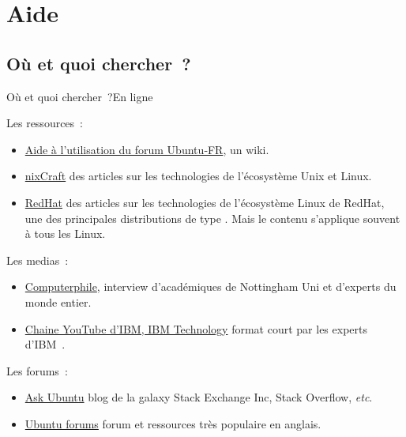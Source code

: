 \documentclass{beamer}
\begin{document}
    \section{Aide}\label{sec:aide}

    \subsection{Où et quoi chercher~?}\label{subsec:aide-ou-quand}

    \begin{frame}{Où et quoi chercher~?}{En ligne}
        \begin{footnotesize}
            Les ressources~:
            \begin{itemize}
                \item \href{https://doc.ubuntu-fr.org/}{Aide à l'utilisation du forum Ubuntu‑FR}, un wiki.
                \item \href{https://www.cyberciti.biz/}{nixCraft} des articles sur les technologies de l'écosystème Unix et Linux.
                \item \href{https://www.redhat.com/}{RedHat} des articles sur les technologies de l'écosystème Linux de RedHat, une des principales distributions de type .
                Mais le contenu s'applique souvent à tous les Linux.
            \end{itemize}
            Les medias~:
            \begin{itemize}
                \item \href{http://www.youtube.com/@Computerphile}{Computerphile}, interview d'académiques de Nottingham Uni et d'experts du monde entier.
                \item \href{http://www.youtube.com/@IBMTechnology}{Chaine YouTube d'IBM, IBM Technology} format court par les experts d'IBM~.
            \end{itemize}
            Les forums~:
            \begin{itemize}
                \item \href{https://askubuntu.com/}{Ask Ubuntu} blog de la galaxy Stack Exchange Inc, Stack Overflow, \textit{etc}.
                \item \href{https://ubuntuforums.org}{Ubuntu forums} forum et ressources très populaire en anglais.
            \end{itemize}
        \end{footnotesize}
    \end{frame}
\end{document}
